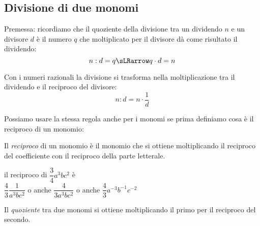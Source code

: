 % 


\subsection{Divisione di due monomi}
\label{subsec:09_monomi_quoziente}

Premessa: ricordiamo che il quoziente della divisione tra un dividendo \(n\) 
e un divisore \(d\) è il numero \(q\) che moltiplicato per il divisore dà come 
risultato il dividendo:
\[n : d = q \sLRarrow q \cdot d = n\]

Con i numeri razionali la divisione si trasforma nella moltiplicazione tra 
il dividendo e il reciproco del divisore:
\[n : d = n \cdot \frac{1}{d}\]

Possiamo usare la stessa regola anche per i monomi se prima definiamo cosa 
è il reciproco di un monomio:

\begin{definizione}
Il \emph{reciproco} di un monomio è il monomio che si ottiene moltiplicando 
il reciproco del coefficiente con il reciproco della parte letterale.
\end{definizione}

\begin{esempio}
 il reciproco di \(\dfrac{3}{4}a^3bc^2\) \quad è\\
\(\dfrac{4}{3}\dfrac{1}{a^3bc^2}\) \quad o anche \quad
\(\dfrac{4}{3a^3bc^2}\) \quad o anche \quad
\(\dfrac{4}{3}a^{-3}b^{-1}c^{-2}\)
\end{esempio}

\begin{definizione}
Il \emph{quoziente} tra due monomi si ottiene moltiplicando il primo per il 
reciproco del secondo.
\end{definizione}

